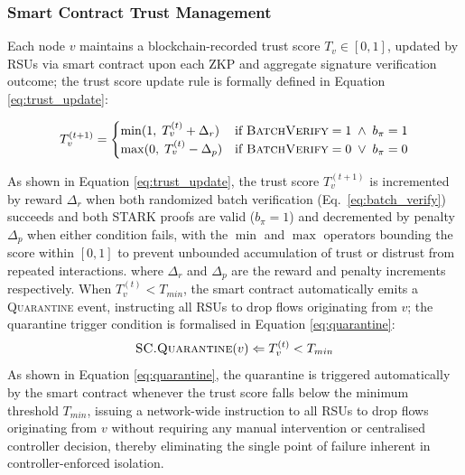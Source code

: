 \documentclass[12pt, a4paper]{report}
\begin{document}
{\subsubsection{Smart Contract Trust Management}
Each node $v$ maintains a blockchain-recorded trust score
$T_v \in [0,1]$, updated by RSUs via smart contract upon each
ZKP and aggregate signature verification outcome;
the trust score update rule is formally defined in
Equation \eqref{eq:trust_update}:

\begin{equation}
T_v^{(t+1)} =
\begin{cases}
\min(1,\; T_v^{(t)} + \Delta_r) &
\text{if } \textsc{BatchVerify} = 1
\;\land\; b_{\pi} = 1 \\
\max(0,\; T_v^{(t)} - \Delta_p) &
\text{if } \textsc{BatchVerify} = 0
\;\lor\; b_{\pi} = 0
\end{cases}
\label{eq:trust_update}
\end{equation}

As shown in Equation \eqref{eq:trust_update}, the trust score
$T_v^{(t+1)}$ is incremented by reward $\Delta_r$ when both randomized batch verification (Eq.~\ref{eq:batch_verify}) succeeds and both STARK proofs are valid ($b_\pi = 1$) and decremented by penalty $\Delta_p$ when either condition fails, with the $\min$ and $\max$ operators bounding the
score within $[0,1]$ to prevent unbounded accumulation of trust or
distrust from repeated interactions.
where $\Delta_r$ and $\Delta_p$ are the reward and penalty
increments respectively. When $T_v^{(t)} < T_{min}$, the smart
contract automatically emits a \textsc{Quarantine} event,
instructing all RSUs to drop flows originating from $v$;
the quarantine trigger condition is formalised in
Equation \eqref{eq:quarantine}:
\begin{equation}
\textsc{SC.Quarantine}(v) \Leftarrow T_v^{(t)} < T_{min}
\label{eq:quarantine}
\end{equation}
As shown in Equation \eqref{eq:quarantine}, the quarantine
is triggered automatically by the smart contract whenever the trust
score falls below the minimum threshold $T_{min}$, issuing a
network-wide instruction to all RSUs to drop flows originating from
$v$ without requiring any manual intervention or centralised
controller decision, thereby eliminating the single point of failure
inherent in controller-enforced isolation.

}
\end{document}
